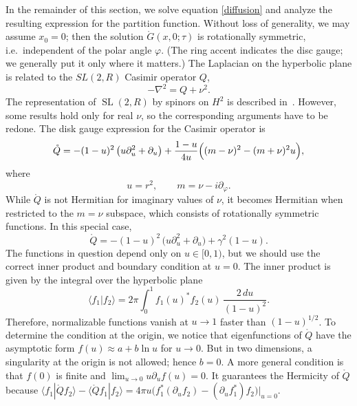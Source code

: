 \documentclass[11pt]{article}
\newcommand*{\braket}[2]{\langle{#1}|{#2}\rangle}
\newcommand{\vp}{\varphi}
\newcommand{\RR}{\mathbb{R}}
\DeclareMathOperator{\SL}{SL}
\DeclareMathOperator{\tSL}{\widetilde{\mathrm{SL}}}
\DeclareMathOperator{\HH}{H}
\newcommand{\rG}{\mathring{G}}
\newcommand{\rQ}{\mathring{Q}}
\def\ie{i.e.\ }
\def\widetilde#1{#1}%
\def\HH{H}
\def\SL{SL}
\def\RR{R}
\begin{document}
In the remainder of this section, we solve equation \eqref{diffusion} and analyze the resulting expression for the partition function. Without loss of generality, we may assume $x_0=0$; then the solution $\rG(x,0;\tau)$ is rotationally symmetric, \ie independent of the polar angle $\vp$. (The ring accent indicates the disc gauge; we generally put it only where it matters.) The Laplacian on the hyperbolic plane is related to the $\SL(2,\RR)$ Casimir operator $Q$,
\begin{equation} \label{nabla}
-\nabla^2=Q+\nu^2.
\end{equation}
The representation of $\tSL(2,\RR)$ by spinors on $\HH^2$ is described in~\cite{SL2R}. However, some results hold only for real $\nu$, so the corresponding arguments have to be redone. The disk gauge expression for the Casimir operator is
\begin{equation} \label{Q_d_gauge}
\rQ=-(1-u)^2\,\bigl(u\partial_{u}^2+\partial_{u}\bigr)
+\frac{1-u}{4u}\Bigl((m-\nu)^2-(m+\nu)^{2}u\Bigr),
\end{equation}
where
\begin{equation}
u=r^2,\qquad m=\nu-i\partial_{\vp}.
\end{equation}
While $\rQ$ is not Hermitian for imaginary values of $\nu$, it becomes Hermitian when restricted to the $m=\nu$ subspace, which consists of rotationally symmetric functions. In this special case,
\begin{equation}\label{Q0}
\rQ=-(1-u)^2\,\bigl(u\partial_{u}^2+\partial_{u}\bigr)+\gamma^2(1-u).
\end{equation}
The functions in question depend only on $u\in[0,1)$, but we should use the correct inner product and boundary condition at $u=0$. The inner product is given by the integral over the hyperbolic plane
\begin{equation}
\braket{f_1}{f_2}=2\pi\int_{0}^{1}f_1(u)^{*}f_2(u)\,\frac{2\,du}{(1-u)^2}.
\end{equation}
Therefore, normalizable functions vanish at $u\to 1$ faster than $(1-u)^{1/2}$. To determine the condition at the origin, we notice that eigenfunctions of $\rQ$ have the asymptotic form $f(u)\approx a+b\ln u$ for $u\to 0$. But in two dimensions, a singularity at the origin is not allowed; hence $b=0$. A more general condition is that $f(0)$ is finite and $\lim_{u\to 0} u\partial_{u}f(u)=0$. It guarantees the Hermicity of $\rQ$ because $\braket{f_1}{\rQ f_2}-\braket{\rQ f_1}{f_2}=4\pi u\bigl(f_1^*(\partial_{u}f_2)-(\partial_{u}f_1^*)f_2\bigr)\big|_{u=0}$.
\end{document}
